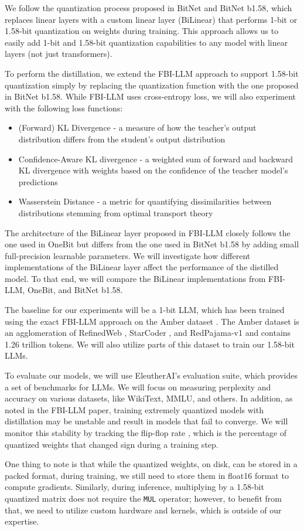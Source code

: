 \documentclass{article}
\begin{document}
We follow the quantization process proposed in BitNet and BitNet b1.58, which replaces linear layers with a custom linear layer (BiLinear) that performs 1-bit or 1.58-bit quantization on weights during training. This approach allows us to easily add 1-bit and 1.58-bit quantization capabilities to any model with linear layers (not just transformers).

To perform the distillation, we extend the FBI-LLM approach to support 1.58-bit quantization simply by replacing the quantization function with the one proposed in BitNet b1.58. While FBI-LLM uses cross-entropy loss, we will also experiment with the following loss functions:

\begin{itemize}
	\item (Forward) KL Divergence - a measure of how the teacher's output distribution differs from the student's output distribution
	\item Confidence-Aware KL divergence - a weighted sum of forward and backward KL divergence with weights based on the confidence of the teacher model's predictions
	\item Wasserstein Distance - a metric for quantifying dissimilarities between distributions stemming from optimal transport theory
\end{itemize}

The architecture of the BiLinear layer proposed in FBI-LLM closely follows the one used in OneBit \cite{onebit} but differs from the one used in BitNet b1.58 by adding small full-precision learnable parameters. We will investigate how different implementations of the BiLinear layer affect the performance of the distilled model. To that end, we will compare the BiLinear implementations from FBI-LLM, OneBit, and BitNet b1.58.

The baseline for our experiments will be a 1-bit LLM, which has been trained using the exact FBI-LLM approach on the Amber dataset \cite{llm360}. The Amber dataset is an agglomeration of RefinedWeb \cite{refinedweb}, StarCoder \cite{starcoder}, and RedPajama-v1 \cite{redpajama} and contains 1.26 trillion tokens. We will also utilize parts of this dataset to train our 1.58-bit LLMs.

To evaluate our models, we will use EleutherAI's evaluation suite, which provides a set of benchmarks for LLMs. We will focus on measuring perplexity and accuracy on various datasets, like WikiText, MMLU, and others. In addition, as noted in the FBI-LLM paper, training extremely quantized models with distillation may be unstable and result in models that fail to converge. We will monitor this stability by tracking the flip-flop rate \cite{flipflop}, which is the percentage of quantized weights that changed sign during a training step.

One thing to note is that while the quantized weights, on disk, can be stored in a packed format, during training, we still need to store them in float16 format to compute gradients. Similarly, during inference, multiplying by a 1.58-bit quantized matrix does not require the \verb|MUL| operator; however, to benefit from that, we need to utilize custom hardware and kernels, which is outside of our expertise.


\end{document}
